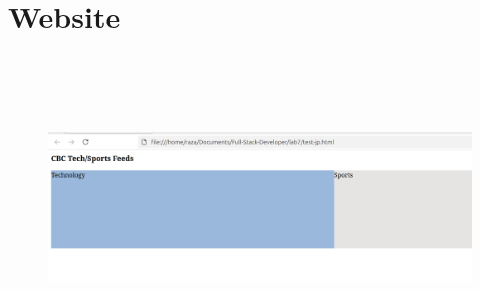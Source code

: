 \documentclass[letterpaper,12pt]{texMemo} %
\begin{document}
\maketitle %





\section{Website}
\begin{figure}[htp]
	\centering 
	
		\includegraphics[clip,width=0.9\columnwidth,height=8cm]{55}%
	


	
		
	
\end{figure}






\end{document}
